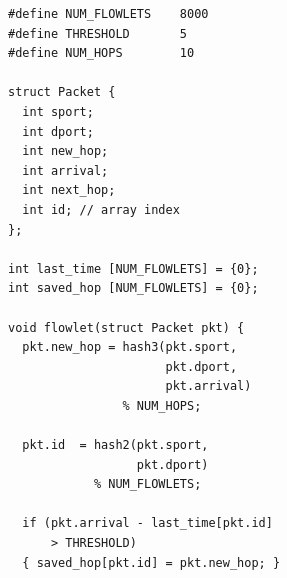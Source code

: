 \begin{figure}[!t]
\begin{minipage}{0.6\textwidth}
\begin{small}
\begin{lstlisting}[style=customc]
#define NUM_FLOWLETS    8000
#define THRESHOLD       5
#define NUM_HOPS        10

struct Packet {
  int sport;
  int dport;
  int new_hop;
  int arrival;
  int next_hop;
  int id; // array index
};

int last_time [NUM_FLOWLETS] = {0};
int saved_hop [NUM_FLOWLETS] = {0};

void flowlet(struct Packet pkt) {
  pkt.new_hop = hash3(pkt.sport,
                      pkt.dport,
                      pkt.arrival)
                % NUM_HOPS;

  pkt.id  = hash2(pkt.sport,
                  pkt.dport)
            % NUM_FLOWLETS;

  if (pkt.arrival - last_time[pkt.id] 
      > THRESHOLD) 
  { saved_hop[pkt.id] = pkt.new_hop; }


\end{lstlisting}
\end{small}
\end{minipage}
\end{figure}
